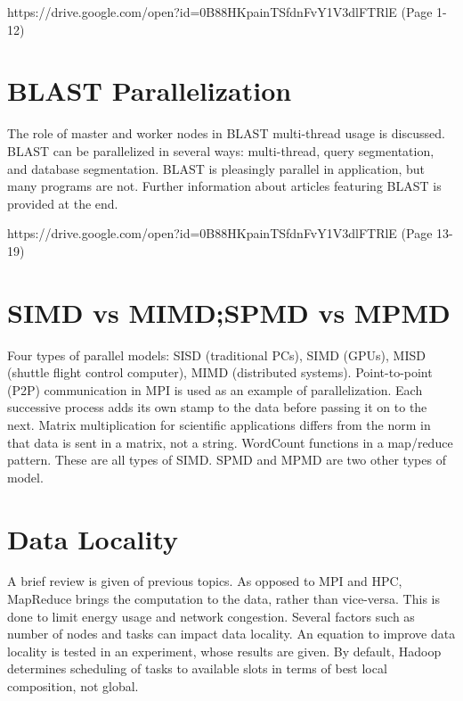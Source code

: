 
{https://drive.google.com/open?id=0B88HKpainTSfdnFvY1V3dlFTRlE
  (Page 1-12)}

\section{BLAST Parallelization}

The role of master and worker nodes in BLAST multi-thread usage is
discussed. BLAST can be parallelized in several ways: multi-thread,
query segmentation, and database segmentation. BLAST is pleasingly
parallel in application, but many programs are not. Further information
about articles featuring BLAST is provided at the end.


{https://drive.google.com/open?id=0B88HKpainTSfdnFvY1V3dlFTRlE
  (Page 13-19)}

\section{SIMD vs MIMD;SPMD vs MPMD}

Four types of parallel models: SISD (traditional PCs), SIMD (GPUs), MISD
(shuttle flight control computer), MIMD (distributed systems).
Point-to-point (P2P) communication in MPI is used as an example of
parallelization. Each successive process adds its own stamp to the data
before passing it on to the next. Matrix multiplication for scientific
applications differs from the norm in that data is sent in a matrix, not
a string. WordCount functions in a map/reduce pattern. These are all
types of SIMD. SPMD and MPMD are two other types of model.


\section{Data Locality}

A brief review is given of previous topics. As opposed to MPI and HPC,
MapReduce brings the computation to the data, rather than vice-versa.
This is done to limit energy usage and network congestion. Several
factors such as number of nodes and tasks can impact data locality. An
equation to improve data locality is tested in an experiment, whose
results are given. By default, Hadoop determines scheduling of tasks to
available slots in terms of best local composition, not global.

